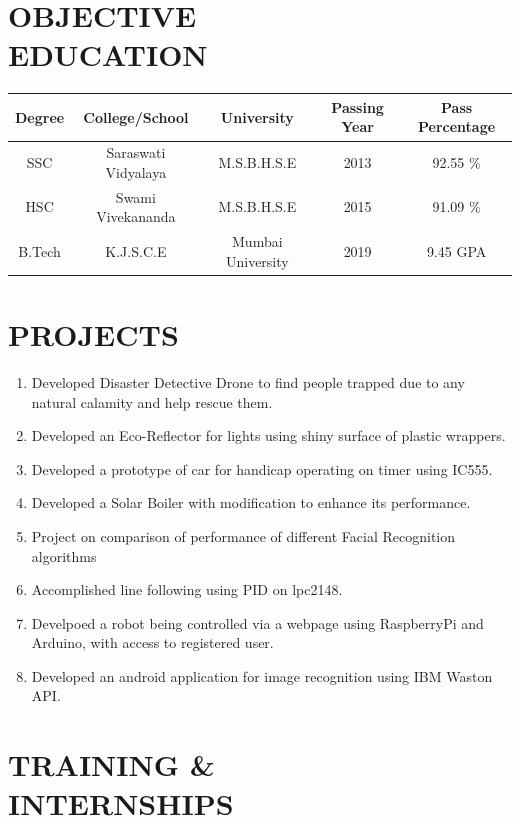 \documentclass[margin, 11pt]{res} %
\begin{document}
\begin{resume}


\section{OBJECTIVE \\ EDUCATION}  

\begin{tabular}{|c|c|c|c|c|}
	\hline
	Degree & College/School & University & Passing Year & Pass Percentage \\
	\hline
	SSC & Saraswati Vidyalaya & M.S.B.H.S.E & 2013 & 92.55 \% \\
	\hline
	HSC & Swami Vivekananda & M.S.B.H.S.E & 2015 & 91.09 \% \\
	\hline
	B.Tech & K.J.S.C.E & Mumbai University & 2019 & 9.45 GPA \\
	\hline
\end{tabular}

\vspace{.15in}
\section{PROJECTS} 

\begin{enumerate}
	\item Developed Disaster Detective Drone to find people trapped due to any natural calamity and help rescue them.
	\item Developed an Eco-Reflector for lights using shiny surface of plastic wrappers.
	\item Developed a prototype of car for handicap operating on timer using IC555.
	\item Developed a Solar Boiler with modification to enhance its performance.
	\item Project on comparison of performance of different Facial Recognition algorithms
	\item Accomplished line following using PID on lpc2148.
	\item Develpoed a robot being controlled via a webpage using RaspberryPi and Arduino, with access to registered user.
	\item Developed an android application for image recognition using IBM Waston API.
\end{enumerate}

\vspace{.15in} 
\section{TRAINING \& \\ INTERNSHIPS}


\end{resume}
\end{document}
